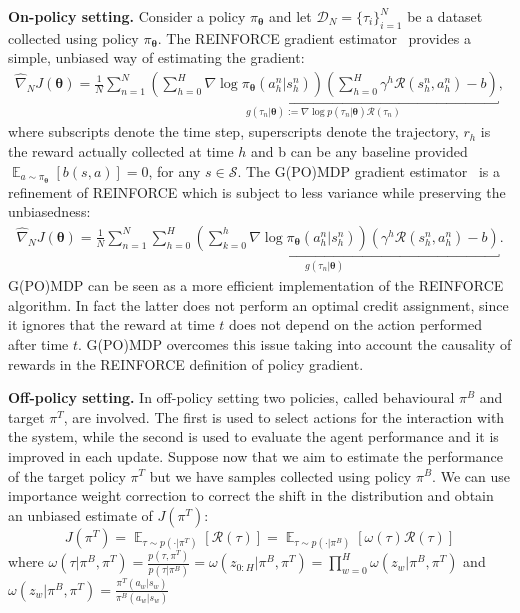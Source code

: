 \documentclass{article}
\theoremstyle{remark}
\theoremstyle{definition}
\newcommand{\todopir}[1]{\todo[color=blued, inline]{\small #1}}
\DeclareMathOperator*{\EV}{\mathbb{E}}
\newcommand{\EVV}[2][\ppvect \in \ppspace]{\EV_{#1}\left[{#2}\right]}
\newcommand{\vtheta}{\boldsymbol{\theta}}
\newcommand{\Sspace}{\mathcal{S}}
\newcommand{\Reward}{\mathcal{R}}
\newcommand{\pol}{\pi_{\vtheta}}
\newcommand{\gradApp}[2]{\widehat{\nabla}_{#2}J(#1)}
\begin{document}
\textbf{On-policy setting.}
Consider a policy $\pol$ and let $\mathcal{D}_N = \{\tau_i\}_{i=1}^N$ be a dataset collected using policy $\pol$.
The REINFORCE gradient estimator~\citep{williams1992simple} provides a simple, unbiased way of estimating the gradient:
\begin{align*}
\gradApp{\vtheta}{N} = \frac{1}{N}\sum_{n=1}^{N}
\underbracket{
        \left(\sum_{h=0}^{H}\nabla \log \pol(a_h^n\vert s_h^n) \right)\left(\sum_{h=0}^{H}\gamma^h \Reward(s_h^n,a_h^n) - b\right)
}_{g(\tau_n|\vtheta):=\nabla \log p(\tau_n|\vtheta)\Reward(\tau_n)}
,
\end{align*}
where subscripts denote the time step, superscripts denote the trajectory, $r_h$ is the reward actually collected at time $h$ and b can be any baseline provided $\EVV[a \sim \pol]{b(s,a)} = 0$, for any $s\in\Sspace$.\todopir{check definition of baseline}
The G(PO)MDP gradient estimator~\cite{baxter2001infinite} is a refinement of REINFORCE which is subject to less variance \cite{zhao2011analysis} while preserving the unbiasedness:
\begin{align*}
\gradApp{\vtheta}{N} = \frac{1}{N}\sum_{n=1}^{N}
\underbracket{
        \sum_{h=0}^{H}\left(\sum_{k=0}^{h} \nabla \log \pol (a_h^n\vert s_h^n) \right)\left(\gamma^h \Reward(s_h^n,a_h^n) - b\right)
}_{g(\tau_n|\vtheta)}.
\end{align*}
G(PO)MDP can be seen as a more efficient implementation
of the REINFORCE algorithm. In fact the latter does not perform
an optimal credit assignment, since it ignores that the reward at time $t$ does
not depend on the action performed after time $t$. G(PO)MDP overcomes this
issue taking into account the causality of rewards in the REINFORCE definition
of policy gradient.

\textbf{Off-policy setting.}
In off-policy setting two policies, called behavioural $\pi^B$ and target $\pi^T$, are involved.
The first is used to select actions for the interaction with the system, while the second is used to evaluate the agent performance and it is improved in each update.
Suppose now that we aim to estimate the performance of the target policy $\pi^T$ but we have samples collected using policy $\pi^B$.
We can use importance weight correction to correct the shift in the distribution and obtain an unbiased estimate of $J(\pi^T)$:
\[
        J(\pi^T) = \EVV[\tau \sim p(\cdot|\pi^T)]{\mathcal{R}(\tau)} = \EVV[\tau \sim p(\cdot|\pi^B)]{\omega(\tau) \mathcal{R}(\tau)}
\]
where $\omega(\tau|\pi^B,\pi^T) = \frac{p(\tau,\pi^T)}{p(\tau|\pi^B)} = \omega(z_{0:H}|\pi^B,\pi^T) = \prod_{w=0}^{H} \omega(z_w|\pi^B,\pi^T)$ and $\omega(z_w|\pi^B,\pi^T) = \frac{\pi^T(a_w|s_w)}{\pi^B(a_w|s_w)}$
\end{document}
